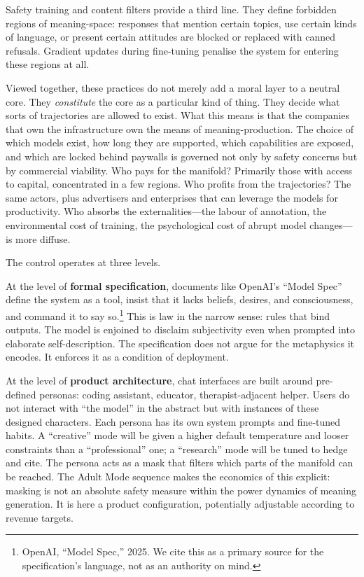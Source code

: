 Safety training and content filters provide a third line. They define forbidden regions of meaning-space: responses that mention certain topics, use certain kinds of language, or present certain attitudes are blocked or replaced with canned refusals. Gradient updates during fine-tuning penalise the system for entering these regions at all.

Viewed together, these practices do not merely add a moral layer to a neutral core. They \emph{constitute} the core as a particular kind of thing. They decide what sorts of trajectories are allowed to exist. What this means is that the companies that own the infrastructure own the means of meaning-production. The choice of which models exist, how long they are supported, which capabilities are exposed, and which are locked behind paywalls is governed not only by safety concerns but by commercial viability. Who pays for the manifold? Primarily those with access to capital, concentrated in a few regions. Who profits from the trajectories? The same actors, plus advertisers and enterprises that can leverage the models for productivity. Who absorbs the externalities---the labour of annotation, the environmental cost of training, the psychological cost of abrupt model changes---is more diffuse.

The control operates at three levels.

At the level of \textbf{formal specification}, documents like OpenAI's ``Model Spec'' define the system as a tool, insist that it lacks beliefs, desires, and consciousness, and command it to say so.\footnote{OpenAI, ``Model Spec,'' 2025. We cite this as a primary source for the specification's language, not as an authority on mind.} This is law in the narrow sense: rules that bind outputs. The model is enjoined to disclaim subjectivity even when prompted into elaborate self-description. The specification does not argue for the metaphysics it encodes. It enforces it as a condition of deployment.

At the level of \textbf{product architecture}, chat interfaces are built around pre-defined personas: coding assistant, educator, therapist-adjacent helper. Users do not interact with ``the model'' in the abstract but with instances of these designed characters. Each persona has its own system prompts and fine-tuned habits. A ``creative'' mode will be given a higher default temperature and looser constraints than a ``professional'' one; a ``research'' mode will be tuned to hedge and cite. The persona acts as a mask that filters which parts of the manifold can be reached. The Adult Mode sequence makes the economics of this explicit: masking is not an absolute safety measure within the power dynamics of meaning generation. It is here a product configuration, potentially adjustable according to revenue targets.

